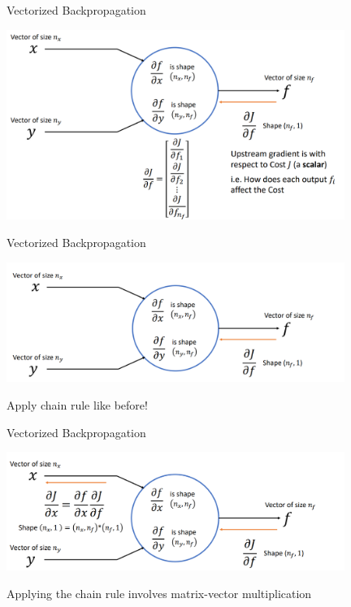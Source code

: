 \documentclass[serif, aspectratio=169]{beamer}
\begin{document}
\begin{frame}{Vectorized Backpropagation}
    \begin{center}
        \includegraphics[width=11cm]{pic/vec4.png}  
    \end{center}
\end{frame}


\begin{frame}{Vectorized Backpropagation}

    \begin{center}
        \includegraphics[width=11cm]{pic/vec5.png}  
    \end{center}
    Apply chain rule like before!
\end{frame}

\begin{frame}{Vectorized Backpropagation}
    \begin{center}
        \includegraphics[width=11cm]{pic/vec6.png}  
    \end{center}
    Applying the chain rule involves matrix-vector multiplication
\end{frame}
\end{document}
